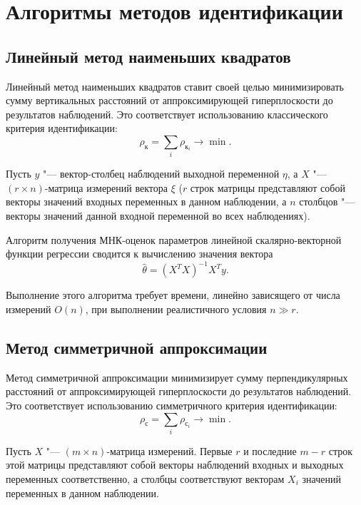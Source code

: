 \section{Алгоритмы методов идентификации}

\subsection{Линейный метод наименьших квадратов}

Линейный метод наименьших квадратов ставит своей целью минимизировать сумму вертикальных расстояний
от аппроксимирующей гиперплоскости до результатов наблюдений.
Это соответствует использованию классического критерия идентификации:
\begin{equation*}
  \rho_{\text{к}} = \sum_i \rho_{\text{к}_i} \rightarrow \min.
\end{equation*}

Пусть \( y \) "--- вектор-столбец наблюдений выходной переменной \( \eta \),
а \( X \) "--- \( (r \times n) \)-матрица измерений вектора \( \xi \)
(\( r \) строк матрицы представляют собой векторы значений входных переменных в данном наблюдении,
а \( n \) столбцов "--- векторы значений данной входной переменной во всех наблюдениях).

Алгоритм получения МНК-оценок параметров линейной скалярно-векторной функции регрессии сводится
к вычислению значения вектора~\cite{wiki_lse}
\begin{equation*}
  \hat{\theta} = (X^{T}X)^{-1}X^{T} y.
\end{equation*}

Выполнение этого алгоритма требует времени, линейно зависящего от числа измерений \( O(n) \),
при выполнении реалистичного условия \( n \gg r \).

\vspace{2\baselineskip}
\subsection{Метод симметричной аппроксимации}

Метод симметричной аппроксимации минимизирует сумму перпендикулярных расстояний
от аппроксимирующей гиперплоскости до результатов наблюдений.
Это соответствует использованию симметричного критерия идентификации:
\begin{equation*}
  \rho_{\text{с}} = \sum_i \rho_{\text{с}_i} \rightarrow \min.
\end{equation*}

Пусть \( X \) "--- \( (m \times n) \)-матрица измерений.
Первые \( r \) и последние \( m - r \) строк этой матрицы представляют собой векторы наблюдений
входных и выходных переменных соответственно,
а столбцы соответствуют векторам \( X_i \) значений переменных в данном наблюдении.

